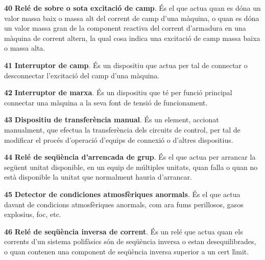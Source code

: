 \begin{multicols}{2}
\begin{list}{}
\item[\textbf{40}]  
 \textbf{Rel\'{e} de sobre o sota excitaci\'{o} de camp}. \'{E}s el que actua quan es
d\'{o}na un valor massa baix o massa alt del corrent de camp d'una m\`{a}quina, o quan es d\'{o}na un valor
massa gran de la component reactiva del corrent d'armadura en una m\`{a}quina de corrent
altern, la qual cosa indica una excitaci\'{o} de camp massa baixa o massa alta.

\item[\textbf{41}]   
\textbf{Interruptor de camp}. \'{E}s un dispositiu
que actua per tal de connectar o desconnectar l'excitaci\'{o} del camp
d'una m\`{a}quina.

\item[\textbf{42}]   
\textbf{Interruptor de marxa}. \'{E}s un
dispositiu que t\'{e} per funci\'{o} principal connectar una m\`{a}quina a la
seva font de tensi\'{o} de funcionament.

\item[\textbf{43}]  
 \textbf{Dispositiu de transfer\`{e}ncia manual}. \'{E}s
un element, accionat manualment, que efectua la transfer\`{e}ncia dels circuits de control, per tal
 de modificar el proc\'{e}s d'operaci\'{o} d'equips de connexi\'{o} o d'altres dispositius.

\item[\textbf{44}]   
\textbf{Rel\'{e} de seq\"{u}\`{e}ncia
d'arrencada de grup}. \'{E}s el que actua per arrancar la seg\"{u}ent unitat
disponible, en un equip de m\'{u}ltiples unitats, quan falla o quan no
est\`{a} disponible la unitat que normalment hauria d'arrancar.

\item[\textbf{45}]   
\textbf{Detector de condiciones
atmosf\`{e}riques anormals}. \'{E}s el que actua davant de condicions atmosf\`{e}riques anormals, com ara fums
perillosos, gasos explosius, foc, etc.

\item[\textbf{46}]   
\textbf{Rel\'{e} de
seq\"{u}\`{e}ncia inversa de corrent}. \'{E}s un rel\'{e} que actua quan els corrents
 d'un sistema polif\`{a}sics s\'{o}n de seq\"{u}\`{e}ncia inversa o estan
desequilibrades, o quan contenen una component de seq\"{u}\`{e}ncia inversa
superior a un cert l\'{\i}mit.


\end{list}
\end{multicols}
